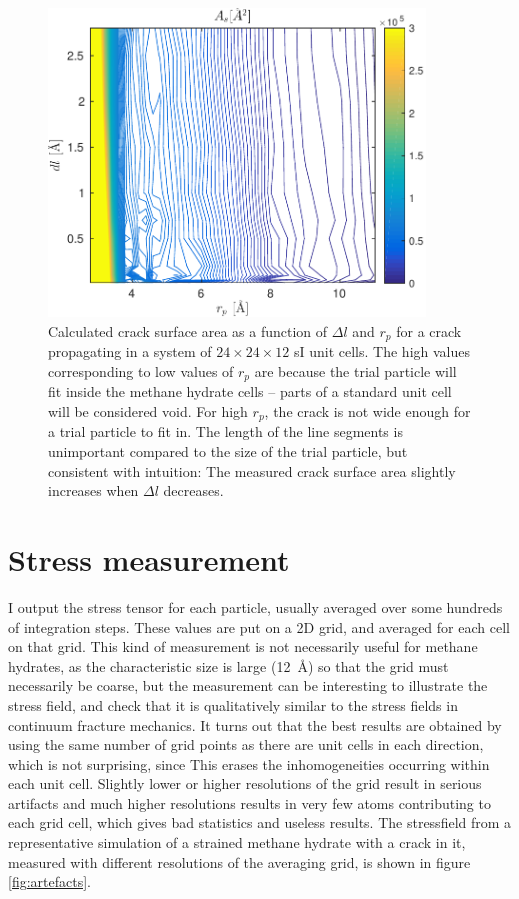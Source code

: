 \begin{figure}
\centering
\includegraphics[width=10cm]{../figures/thesis/crack_tracer_test.pdf}
\caption{Calculated crack surface area as a function of $\Delta l$ and $r_p$ for a crack propagating in a system of $24\times 24 \times 12$ sI unit cells. The high values corresponding to low values of $r_p$ are because the trial particle will fit inside the methane hydrate cells -- parts of a standard unit cell will be considered void. For high $r_p$, the crack is not wide enough for a trial particle to fit in. The length of the line segments is unimportant compared to the size of the trial particle, but consistent with intuition: The measured crack surface area slightly increases when $\Delta l$ decreases.}
\label{fig:crack_trace_test}
\end{figure}


\section{Stress measurement}
I output the stress tensor for each particle, usually averaged over some hundreds of integration steps. These values are put on a 2D grid, and averaged for each cell on that grid. This kind of measurement is not necessarily useful for methane hydrates, as the characteristic size is large (\SI{12}{\angstrom}) so that the grid must necessarily be coarse, but the measurement can be interesting to illustrate the stress field, and check that it is qualitatively similar to the stress fields in continuum fracture mechanics. It turns out that the best results are obtained by using the same number of grid points as there are unit cells in each direction, which is not surprising, since This erases the inhomogeneities occurring within each unit cell. Slightly lower or higher resolutions of the grid result in serious artifacts and much higher resolutions results in very few atoms contributing to each grid cell, which gives bad statistics and useless results. The stressfield from a representative simulation of a strained methane hydrate with a crack in it, measured with different resolutions of the averaging grid, is shown in figure \ref{fig:artefacts}.

